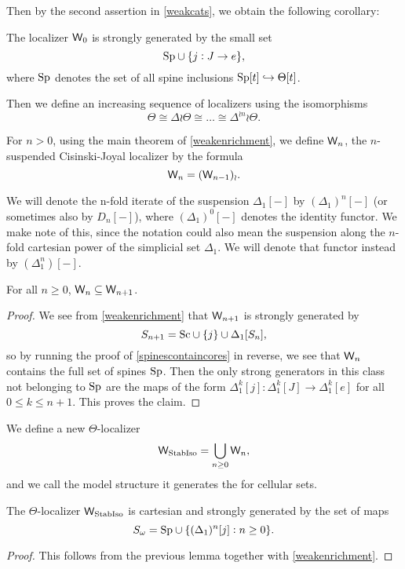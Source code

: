 Then by the second assertion in \eqref{weakcats}, we obtain the following corollary:
\begin{cor}The localizer \(\mathsf{W}_0\) is strongly generated by the small set \[{\operatorname{Sp}} \cup \{j:J\to e\},\] where \({\operatorname{Sp}}\) denotes the set of all spine inclusions \({\operatorname{Sp}}[t]\hookrightarrow \Theta[t]\).  
\end{cor} 
Then we define an increasing sequence of localizers using the isomorphisms \[\Theta\cong \Delta\wr \Theta \cong \dots \cong \Delta^{\wr n}\wr \Theta.\]
\begin{defn} For \(n>0\), using the main theorem of \eqref{weakenrichment}, we define \(\mathsf{W}_n\),  the \(n\)-suspended Cisinski-Joyal localizer by the formula \[\mathsf{W}_n=(\mathsf{W}_{n-1})_\wr.\]
\end{defn}
\begin{note}We will denote the n-fold iterate of the suspension \(\Delta_1[-]\) by \((\Delta_1)^n[-]\) (or sometimes also by \(D_n[-]\)), where \((\Delta_1)^0[-]\) denotes the identity functor.  We make note of this, since the notation could also mean the suspension along the \(n\)-fold cartesian power of the simplicial set \(\Delta_1\).  We will denote that functor instead by \((\Delta_1^n)[-]\).
\end{note}
\begin{lemma} For all \(n\geq 0\), \(\mathsf{W}_n\subseteq \mathsf{W}_{n+1}\).  
\end{lemma}
\begin{proof}We see from \eqref{weakenrichment} that \(\mathsf{W}_{n+1}\) is strongly generated by \[S_{n+1}={\operatorname{Sc}} \cup \{j\} \cup \Delta_1[S_n],\] so by running the proof of \eqref{spinescontaincores} in reverse, we see that \(\mathsf{W}_n\) contains the full set of spines \({\operatorname{Sp}}\).  Then the only strong generators in this class not belonging to \({\operatorname{Sp}}\) are the maps of the form \(\Delta_1^k[j]:\Delta_1^k[J]\to \Delta_1^k[e]\) for all \(0\leq k\leq n+1\).  This proves the claim.
\end{proof}
\begin{defn}We define a new \(\Theta\)-localizer \[\mathsf{W}_{\operatorname{StabIso}}=\bigcup_{n\geq 0} \mathsf{W}_n,\] and we call the model structure it generates the  for cellular sets.  
\end{defn}
\begin{prop} The \(\Theta\)-localizer \(\mathsf{W}_{\operatorname{StabIso}}\) is cartesian and strongly generated by the set of maps \[S_\omega={\operatorname{Sp}}\cup \{(\Delta_1)^n[j]:n\geq 0\}.\]
\end{prop}
\begin{proof} This follows from the previous lemma together with \eqref{weakenrichment}.
\end{proof}
